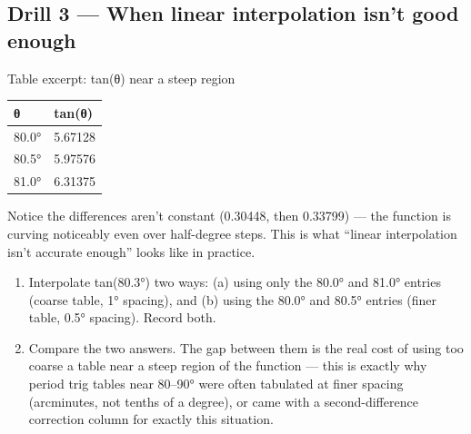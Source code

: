 \documentclass[
  10pt,
]{article}
\providecommand{\tightlist}{%
  \setlength{\itemsep}{0pt}\setlength{\parskip}{0pt}}
\begin{document}
\hypertarget{drill-3-when-linear-interpolation-isnt-good-enough}{%
\subsection{Drill 3 --- When linear interpolation isn't good
enough}\label{drill-3-when-linear-interpolation-isnt-good-enough}}

Table excerpt: tan(θ) near a steep region

\begin{longtable}[]{@{}ll@{}}
\toprule
θ & tan(θ)\tabularnewline
\midrule
\endhead
80.0° & 5.67128\tabularnewline
80.5° & 5.97576\tabularnewline
81.0° & 6.31375\tabularnewline
\bottomrule
\end{longtable}

Notice the differences aren't constant (0.30448, then 0.33799) --- the
function is curving noticeably even over half-degree steps. This is what
``linear interpolation isn't accurate enough'' looks like in practice.

\begin{enumerate}
\def\labelenumi{\arabic{enumi}.}
\tightlist
\item
  Interpolate tan(80.3°) two ways: (a) using only the 80.0° and 81.0°
  entries (coarse table, 1° spacing), and (b) using the 80.0° and 80.5°
  entries (finer table, 0.5° spacing). Record both.
\item
  Compare the two answers. The gap between them is the real cost of
  using too coarse a table near a steep region of the function --- this
  is exactly why period trig tables near 80--90° were often tabulated at
  finer spacing (arcminutes, not tenths of a degree), or came with a
  second-difference correction column for exactly this situation.
\end{enumerate}
\end{document}

